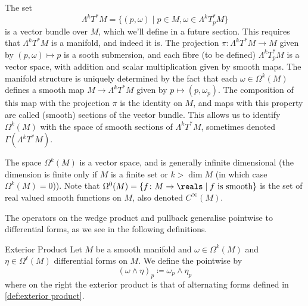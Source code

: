 \documentclass[fleqn]{NotesClass}
\begin{document}
    \begin{remark}{}{}
        The set
        \begin{equation}
            \Lambda^k T^*M = \{(p, \omega) \mid p \in M, \omega \in \Lambda^kT^*_pM\}
        \end{equation}
        is a vector bundle over \(M\), which we'll define in a future section.
        This requires that \(\Lambda^kT^*M\) is a manifold, and indeed it is.
        The projection \(\pi \colon \Lambda^k T^* M \to M\) given by \((p, \omega) \mapsto p\) is a sooth submersion, and each fibre (to be defined) \(\Lambda^kT^*_pM\) is a vector space, with addition and scalar multiplication given by smooth maps.
        The manifold structure is uniquely determined by the fact that each \(\omega \in \Omega^k(M)\) defines a smooth map \(M \to \Lambda^k T^*M\) given by \(p \mapsto (p, \omega_p)\).
        The composition of this map with the projection \(\pi\) is the identity on \(M\), and maps with this property are called (smooth) sections of the vector bundle.
        This allows us to identify \(\Omega^k(M)\) with the space of smooth sections of \(\Lambda^kT^*M\), sometimes denoted \(\Gamma(\Lambda^kT^*M)\).
        
        The space \(\Omega^k(M)\) is a vector space, and is generally infinite dimensional (the dimension is finite only if \(M\) is a finite set or \(k > \dim M\) (in which case \(\Omega^k(M) = 0\))).
        Note that \(\Omega^0(M) = \{f \colon M \to \reals \mid f \text{ is smooth}\}\) is the set of real valued smooth functions on \(M\), also denoted \(C^{\infty}(M)\).
    \end{remark}
    
    The operators on the wedge product and pullback generalise pointwise to differential forms, as we see in the following definitions.
    
    \begin{dfn}{Exterior Product}{}
        Let \(M\) be a smooth manifold and \(\omega \in \Omega^k(M)\) and \(\eta \in \Omega^{\ell}(M)\) differential forms on \(M\).
        We define the  pointwise by
        \begin{equation}
            (\omega \wedge \eta)_p \coloneqq \omega_p \wedge \eta_p
        \end{equation}
        where on the right the exterior product is that of alternating forms defined in \cref{def:exterior product}.
    \end{dfn}
    
\end{document}
